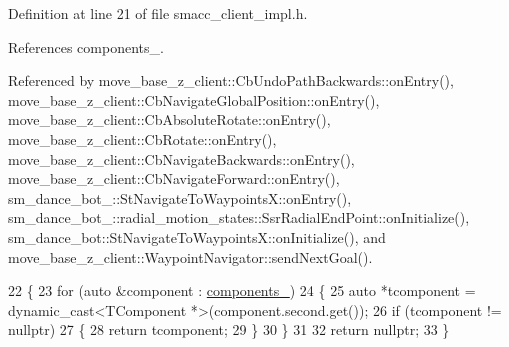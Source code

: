 Definition at line 21 of file smacc\+\_\+client\+\_\+impl.\+h.



References components\+\_\+.



Referenced by move\+\_\+base\+\_\+z\+\_\+client\+::\+Cb\+Undo\+Path\+Backwards\+::on\+Entry(), move\+\_\+base\+\_\+z\+\_\+client\+::\+Cb\+Navigate\+Global\+Position\+::on\+Entry(), move\+\_\+base\+\_\+z\+\_\+client\+::\+Cb\+Absolute\+Rotate\+::on\+Entry(), move\+\_\+base\+\_\+z\+\_\+client\+::\+Cb\+Rotate\+::on\+Entry(), move\+\_\+base\+\_\+z\+\_\+client\+::\+Cb\+Navigate\+Backwards\+::on\+Entry(), move\+\_\+base\+\_\+z\+\_\+client\+::\+Cb\+Navigate\+Forward\+::on\+Entry(), sm\+\_\+dance\+\_\+bot\+\_\+::\+St\+Navigate\+To\+Waypoints\+X\+::on\+Entry(), sm\+\_\+dance\+\_\+bot\+\_\+::radial\+\_\+motion\+\_\+states\+::\+Ssr\+Radial\+End\+Point\+::on\+Initialize(), sm\+\_\+dance\+\_\+bot\+::\+St\+Navigate\+To\+Waypoints\+X\+::on\+Initialize(), and move\+\_\+base\+\_\+z\+\_\+client\+::\+Waypoint\+Navigator\+::send\+Next\+Goal().


\begin{DoxyCode}
22 \{
23     \textcolor{keywordflow}{for} (\textcolor{keyword}{auto} &component : \hyperlink{classsmacc_1_1ISmaccClient_ab983e85d296c9660f5943c1d511634ce}{components\_})
24     \{
25         \textcolor{keyword}{auto} *tcomponent = \textcolor{keyword}{dynamic\_cast<}TComponent *\textcolor{keyword}{>}(component.second.get());
26         \textcolor{keywordflow}{if} (tcomponent != \textcolor{keyword}{nullptr})
27         \{
28             \textcolor{keywordflow}{return} tcomponent;
29         \}
30     \}
31 
32     \textcolor{keywordflow}{return} \textcolor{keyword}{nullptr};
33 \}
\end{DoxyCode}


